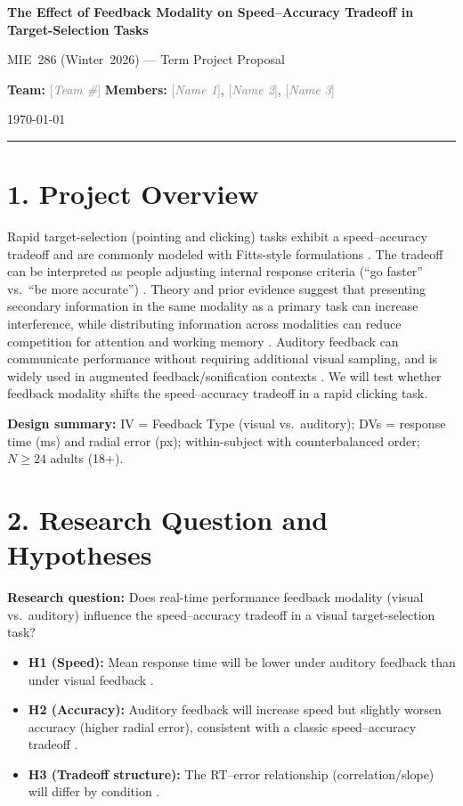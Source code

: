 \documentclass[12pt,letterpaper]{article}
\newcommand{\placeholder}[1]{\textcolor{gray}{[\textit{#1}]}}
\begin{document}
\begin{center}
{\Large\bfseries The Effect of Feedback Modality on Speed--Accuracy Tradeoff in Target-Selection Tasks\par}
\vspace{0.15em}
{\normalsize MIE~286 (Winter~2026) --- Term Project Proposal\par}
\vspace{0.3em}
{\normalsize
\textbf{Team:} \placeholder{Team \#} \quad
\textbf{Members:} \placeholder{Name 1}, \placeholder{Name 2}, \placeholder{Name 3}\par}
{\normalsize \today\par}
\end{center}
\vspace{-0.2em}
\hrule
\vspace{0.4em}

\section*{1. Project Overview}
Rapid target-selection (pointing and clicking) tasks exhibit a speed--accuracy tradeoff and are commonly modeled with Fitts-style formulations \citep{fitts1954,mackenzie1992}. The tradeoff can be interpreted as people adjusting internal response criteria (``go faster'' vs.\ ``be more accurate'') \citep{heitz2014,ratcliff2008}. Theory and prior evidence suggest that presenting secondary information in the same modality as a primary task can increase interference, while distributing information across modalities can reduce competition for attention and working memory \citep{wickens2015,klingner_nd}. Auditory feedback can communicate performance without requiring additional visual sampling, and is widely used in augmented feedback/sonification contexts \citep{sigrist2013,hermann2011}. We will test whether feedback modality shifts the speed--accuracy tradeoff in a rapid clicking task.

\noindent\textbf{Design summary:} IV = Feedback Type (visual vs.\ auditory); DVs = response time (ms) and radial error (px); within-subject with counterbalanced order; $N\ge 24$ adults (18+).

\section*{2. Research Question and Hypotheses}
\textbf{Research question:} Does real-time performance feedback modality (visual vs.\ auditory) influence the speed--accuracy tradeoff in a visual target-selection task?
\begin{itemize}
  \item \textbf{H1 (Speed):} Mean response time will be lower under auditory feedback than under visual feedback \citep{wickens2015}.
  \item \textbf{H2 (Accuracy):} Auditory feedback will increase speed but slightly worsen accuracy (higher radial error), consistent with a classic speed--accuracy tradeoff \citep{heitz2014}.
  \item \textbf{H3 (Tradeoff structure):} The RT--error relationship (correlation/slope) will differ by condition \citep{heitz2014}.
\end{itemize}
\end{document}
